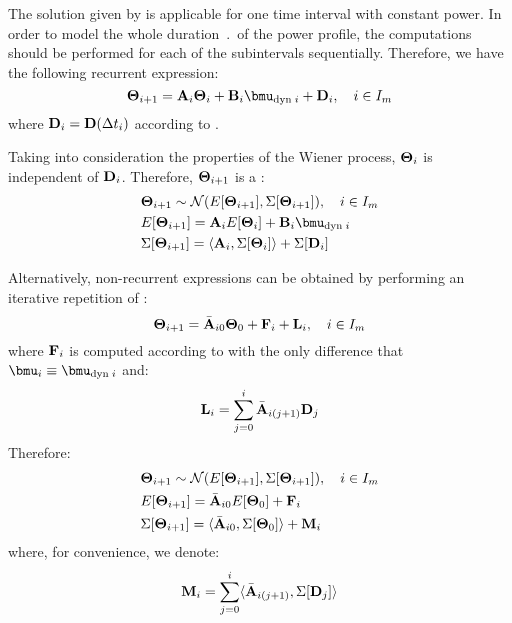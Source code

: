 The solution given by  is applicable for one time interval with constant power. In order to model the whole duration $\period$ of the power profile, the computations should be performed for each of the subintervals sequentially. Therefore, we have the following recurrent expression:
\begin{equation} \equlabel{tta-fourier-recurrence-noise}
  \vtemp_{i + 1} = \m{A}_i \vtemp_i + \m{B}_i \vmean{\dyn \; i} + \m{D}_i, \sep i \in \timeindex
\end{equation}
where $\mathbf{D}_i = \mathbf{D}(\Delta t_i)$ according to .

Taking into consideration the properties of the Wiener process, $\mathbf{\Theta}_i$ is independent of $\mathbf{D}_i$. Therefore, $\mathbf{\Theta}_{i+1}$ is a \mnrv:
\begin{align}
  & \vtemp_{i + 1} \sim \normal(\expect{\vtemp_{i + 1}}, \cov{\vtemp_{i + 1}}), \sep i \in \timeindex \equlabel{tta-probabilistic-recurrence-noise} \\
  & \expect{\vtemp_{i+1}} = \m{A}_i \expect{\vtemp_i} + \m{B}_i \vmean{\dyn \; i} \nonumber \\
  & \cov{\vtemp_{i+1}} = \dbl{\m{A}_i, \cov{\vtemp_i}} + \cov{\m{D}_i} \nonumber
\end{align}

Alternatively, non-recurrent expressions can be obtained by performing an iterative repetition of :
\begin{equation} \equlabel{tta-fourier-non-recurrent-noise}
  \vtemp_{i + 1} = \am{A}_{i0} \vtemp_0 + \m{F}_i + \v{L}_i, \sep i \in \timeindex
\end{equation}
where $\mathbf{F}_i$ is computed according to  with the only difference that $\vmean{i} \equiv \vmean{\dyn \; i}$ and:
\begin{equation} \equlabel{l}
  \v{L}_i = \sum_{j = 0}^{i} \am{A}_{i(j+1)} \m{D}_j
\end{equation}
Therefore:
\begin{align*}
  & \mathbf{\Theta}_{i + 1} \sim \mathcal{N}(E[\mathbf{\Theta}_{i + 1}], \Sigma[\mathbf{\Theta}_{i + 1}]), \hspace{10pt} i \in I_m \\
  & E[\mathbf{\Theta}_{i + 1}] = \Bar{\mathbf{A}}_{i0} E[\mathbf{\Theta}_0] + \mathbf{F}_i \\
  & \Sigma[\mathbf{\Theta}_{i + 1}] = \langle \Bar{\mathbf{A}}_{i0}, \Sigma[\mathbf{\Theta}_0] \rangle + \mathbf{M}_i
\end{align*}
where, for convenience, we denote:
\begin{equation} \equlabel{m}
  \m{M}_i = \sum_{j = 0}^{i} \dbl{\am{A}_{i(j+1)}, \cov{\m{D}_j}}
\end{equation}
